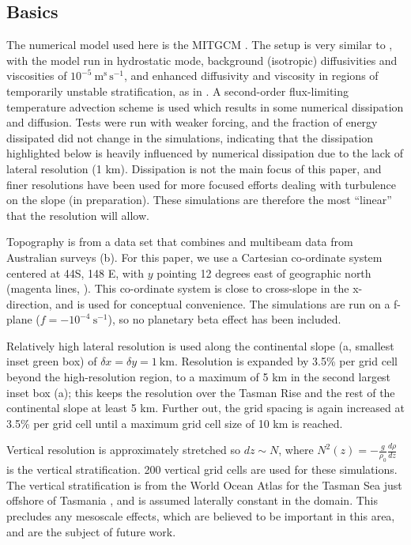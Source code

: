 \documentclass[10pt]{article}
\begin{document}
\subsection{Basics}

The numerical model used here is the MITGCM \citep{marshalletal06}.  The setup is very similar to \citet{buijsmanetal14}, with the model run in hydrostatic mode, background (isotropic) diffusivities and viscosities of $10^{-5}\ \mathrm{m^s\,s^{-1}}$, and enhanced diffusivity and viscosity in regions of temporarily unstable stratification, as in \citet{klymaklegg10}.  A second-order flux-limiting temperature advection scheme is used which results in some numerical dissipation and diffusion.  Tests were run with weaker forcing, and the fraction of energy dissipated did not change in the simulations, indicating that the dissipation highlighted below is heavily influenced by numerical dissipation due to the lack of lateral resolution (1 km). Dissipation is not the main focus of this paper, and finer resolutions have been used for more focused efforts dealing with turbulence on the slope (in preparation).  These simulations are therefore the most ``linear'' that the resolution will allow.  

Topography is from a data set that combines \citet{smithsandwell97} and multibeam data from Australian surveys \citep{Whiteway09a} (b).  For this paper, we use a Cartesian co-ordinate system centered at 44S, 148 E, with $y$ pointing 12 degrees east of geographic north (magenta lines, ).  This co-ordinate system is close to cross-slope in the x-direction, and is used for conceptual convenience.  The simulations are run on a f-plane ($f=-10^{-4}\ \mathrm{s^{-1}}$), so no planetary beta effect has been included.  

Relatively high lateral resolution is used along the continental slope (a, smallest inset green box) of $\delta x=\delta y=1\ \mathrm{km}$.  Resolution is expanded by 3.5\% per grid cell beyond the high-resolution region, to a maximum of 5 km in the second largest inset box (a); this keeps the resolution over the Tasman Rise and the rest of the continental slope at least 5 km.  Further out, the grid spacing is again increased at 3.5\% per grid cell until a maximum grid cell size of 10 km is reached.  

Vertical resolution is approximately stretched so $dz\sim N$, where $N^2(z)=-\frac{g}{\rho_0}\frac{d\rho}{dz}$ is the vertical stratification.  200 vertical grid cells are used for these simulations. The vertical stratification is from the World Ocean Atlas for the Tasman Sea just offshore of Tasmania \citep{woa13}, and is assumed laterally constant in the domain.  This precludes any mesoscale effects, which are believed to be important in this area, and are the subject of future work.
\end{document}
